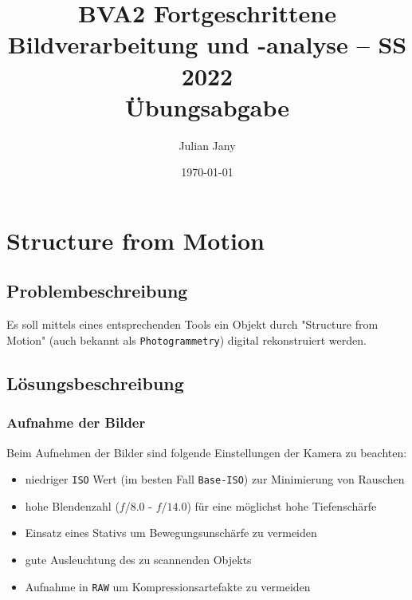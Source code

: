 \documentclass[german,notitlepage,smartquotes]{hgbreport}
\author{Julian Jany}                        %
\title{BVA2 Fortgeschrittene Bildverarbeitung und -analyse -- SS 2022\\ %
				Übungsabgabe \arabic{chapter}}
\date{\today}
\begin{document}
\maketitle





\section{Structure from Motion}

\subsection{Problembeschreibung}

Es soll mittels eines entsprechenden Tools ein Objekt durch "Structure from Motion" (auch bekannt als \texttt{Photogrammetry}) digital rekonstruiert werden.

\subsection{Lösungsbeschreibung}

\subsubsection{Aufnahme der Bilder}

Beim Aufnehmen der Bilder sind folgende Einstellungen der Kamera zu beachten:

\begin{itemize}
	\item niedriger \texttt{ISO} Wert (im besten Fall \texttt{Base-ISO}) zur Minimierung von Rauschen
	\item hohe Blendenzahl ($f$/$8.0$ - $f$/$14.0$) für eine möglichst hohe Tiefenschärfe
	\item Einsatz eines Stativs um Bewegungsunschärfe zu vermeiden
	\item gute Ausleuchtung des zu scannenden Objekts
	\item Aufnahme in \texttt{RAW} um Kompressionsartefakte zu vermeiden
\end{itemize}
\end{document}
